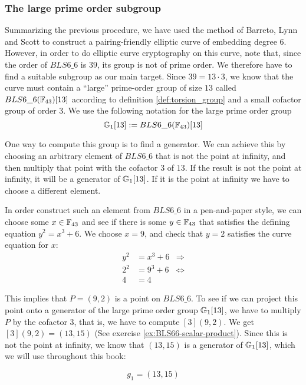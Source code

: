 \subsubsection{The large prime order subgroup}
Summarizing the previous procedure, we have used the method of Barreto, Lynn and Scott to construct a pairing-friendly elliptic curve of embedding degree $6$. However, in order to do elliptic curve cryptography on this curve, note that, since the order of $BLS6\_6$ is $39$, its group is not of prime order. We therefore have to find a suitable subgroup as our main target. Since $39=13\cdot 3$, we know that the curve must contain a ``large'' prime-order group of size $13$ called $BLS6\_6(\mathbb{F}_{43})[13]$ according to definition \ref{def:torsion_group} and a small cofactor group of order $3$. We use the following notation for the large prime order group
\begin{equation}
\label{def:BLS6613}
\mathbb{G}_1[13]:= BLS6\_6(\mathbb{F}_{43})[13]
\end{equation}

One way to compute this group is to find a generator. We can achieve this by choosing an arbitrary element of $BLS6\_6$ that is not the point at infinity, and then multiply that point with the cofactor $3$ of $13$. If the result is not the point at infinity, it will be a generator of $\mathbb{G}_1[13]$. If it is the point at infinity we have to choose a different element. 

In order construct such an element from $BLS6\_6$ in a pen-and-paper style, we can choose some $x\in\mathbb{F}_{43}$ and see if there is some $y\in\mathbb{F}_{43}$ that satisfies the defining  equation $y^2 = x^3 + 6$. We choose $x=9$, and check that $y=2$ satisfies the curve equation for $x$:
\begin{align*}
y^2 & = x^3 + 6 & \Rightarrow \\
2^2 & = 9^3 + 6 & \Leftrightarrow \\
4 & = 4
\end{align*}   

This implies that $P=(9,2)$ is a point on $BLS6\_6$. To see if we can project this point onto a generator of the large prime order group $\mathbb{G}_1[13]$, we have to multiply $P$ by the cofactor $3$, that is, we have to compute $[3](9,2)$. We get $[3](9,2) = (13,15)$ (See exercise \ref{ex:BLS66-scalar-product}). Since this is not the point at infinity, we know that $(13,15)$ is a generator of $\mathbb{G}_1[13]$, which we will use throughout this book: 

\begin{equation}\label{gBLS6-6-13}
g_{1} = (13,15)
\end{equation}

